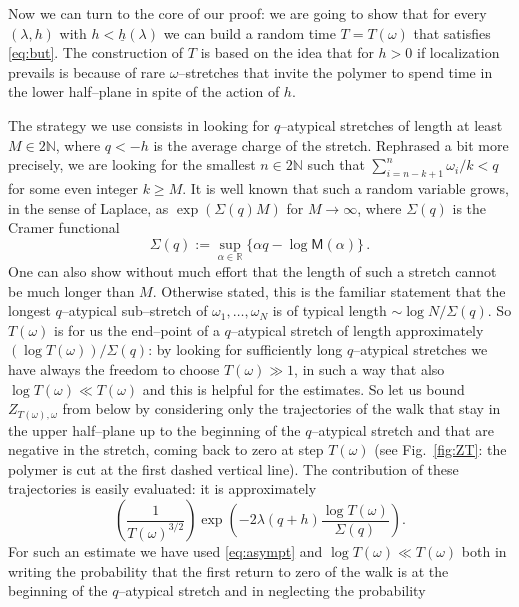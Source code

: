 \documentclass[reqno,11pt]{amsart}
\numberwithin{equation}{section}
\newcommand{\R}{\mathbb{R}}
\newcommand{\N}{\mathbb{N}}
\newcommand{\ga}{\alpha}
\newcommand{\go}{\omega}
\newcommand{\gl}{\lambda}
\newcommand{\gS}{\Sigma}
\newcommand{\M}{\textsf{M}}
\begin{document}
\medskip

Now we can turn to the core of our proof: we are going to show that for every $(\gl,h)$ with $h<\underline h (\gl)$ we can build a random time $T=T(\go)$ that satisfies \eqref{eq:but}.
The construction of $T$
 is based on the  idea that for $h>0$ if localization prevails
 is because of rare $\go$--stretches that invite the polymer
 to spend time in the lower half--plane in spite of the action of $h$.

The strategy we use consists in looking
for $q$--atypical stretches of length at least $M\in 2\N$, where $q<-h$ is
the average charge of the stretch. Rephrased a bit more precisely,
we are looking for the smallest $n\in 2\N$ such that
$\sum_{i=n-k+1}^n \go_i /k <q$ for some even integer $k \ge M$.
It is well known that such a random variable grows, in the sense
of Laplace, as $\exp(\Sigma(q) M)$ for $M\to \infty$, where $\gS(q)$ is the Cramer functional
\begin{equation}
\label{eq:cramer}
\gS(q) := \sup_{\ga\in\R} \{\ga q-\log \M(\ga)\}\,.
\end{equation}
One can also show without much effort that the length of such a stretch
cannot be much longer than $M$.
Otherwise stated, this is the familiar statement that the longest $q$--atypical
sub--stretch of $\go_1, \ldots , \go_N$ is of typical length $\sim \log N/\Sigma (q)$.
 So $T(\go)$ is for us the end--point
of a $q$--atypical stretch of length approximately $(\log T(\go))/\Sigma(q)$:
by looking for sufficiently long $q$--atypical stretches
we have always the freedom to choose $T(\go) \gg 1$, in such a
way that also $\log T(\go) \ll T(\go)$ and this is helpful for the estimates.
So let us bound $Z_{T(\go), \go}$ from
below by considering only the trajectories of the walk that
stay in the upper half--plane up to the beginning of the $q$--atypical stretch and
that are negative in the stretch, coming back to zero at step $T(\go)$
(see Fig.~\ref{fig:ZT}: the polymer is cut at the first dashed vertical line).
The contribution of these trajectories is easily evaluated: it is approximately
\begin{equation}
\label{eq:int1}
\left(
\frac {1} {T(\go)^{3/2}}
\right)
 \exp\left( -2\gl (q+h)  \frac{\log T(\go)}{\Sigma(q)}\right).
\end{equation}
For such an estimate we have used
\eqref{eq:asympt} and $\log T(\go) \ll T(\go)$
both in writing the probability that the first return to zero
of the walk is at the beginning of the $q$--atypical stretch and in neglecting the probability
\end{document}
